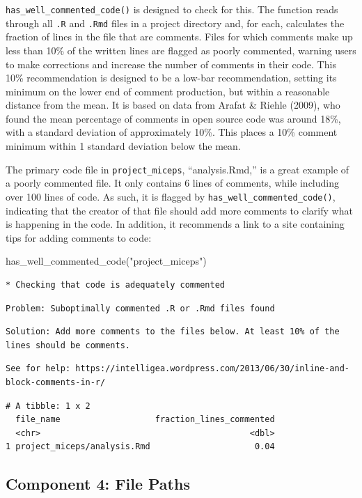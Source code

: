 \documentclass[12pt,twoside]{reedthesis}
\newenvironment{Shaded}{\begin{snugshade}}{\end{snugshade}}
\newcommand{\FunctionTok}[1]{\textcolor[rgb]{0.00,0.00,0.00}{#1}}
\newcommand{\NormalTok}[1]{#1}
\newcommand{\StringTok}[1]{\textcolor[rgb]{0.31,0.60,0.02}{#1}}
\begin{document}
\texttt{has\_well\_commented\_code()} is designed to check for this. The function reads through all \texttt{.R} and \texttt{.Rmd} files in a project directory and, for each, calculates the fraction of lines in the file that are comments. Files for which comments make up less than 10\% of the written lines are flagged as poorly commented, warning users to make corrections and increase the number of comments in their code. This 10\% recommendation is designed to be a low-bar recommendation, setting its minimum on the lower end of comment production, but within a reasonable distance from the mean. It is based on data from Arafat \& Riehle (2009), who found the mean percentage of comments in open source code was around 18\%, with a standard deviation of approximately 10\%. This places a 10\% comment minimum within 1 standard deviation below the mean.

The primary code file in \texttt{project\_miceps}, ``analysis.Rmd,'' is a great example of a poorly commented file. It only contains 6 lines of comments, while including over 100 lines of code. As such, it is flagged by \texttt{has\_well\_commented\_code()}, indicating that the creator of that file should add more comments to clarify what is happening in the code. In addition, it recommends a link to a site containing tips for adding comments to code:
\begin{Shaded}
\begin{Highlighting}[]
\FunctionTok{has\_well\_commented\_code}\NormalTok{(}\StringTok{"project\_miceps"}\NormalTok{)}
\end{Highlighting}
\end{Shaded}
\begin{verbatim}
* Checking that code is adequately commented 
\end{verbatim}
\begin{verbatim}
Problem: Suboptimally commented .R or .Rmd files found 
\end{verbatim}
\begin{verbatim}
Solution: Add more comments to the files below. At least 10% of the
lines should be comments. 
\end{verbatim}
\begin{verbatim}
See for help: https://intelligea.wordpress.com/2013/06/30/inline-and-
block-comments-in-r/
\end{verbatim}
\begin{verbatim}
# A tibble: 1 x 2
  file_name                   fraction_lines_commented
  <chr>                                          <dbl>
1 project_miceps/analysis.Rmd                     0.04
\end{verbatim}
\hypertarget{component-4-file-paths}{%
\subsection{Component 4: File Paths}\label{component-4-file-paths}}
\end{document}
